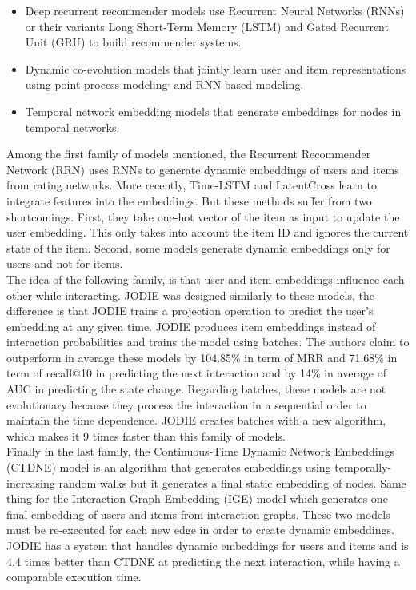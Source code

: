 {\begin{itemize}
    \item Deep recurrent recommender models use Recurrent Neural Networks\supercite{Rumelhart1986} (RNNs) or their variants Long Short-Term Memory\supercite{LSTM} (LSTM) and Gated Recurrent Unit\supercite{https://doi.org/10.48550/arxiv.1406.1078GRU} (GRU) to build recommender systems.
    \item Dynamic co-evolution models that jointly learn user and item representations using point-process modeling\supercite{https://doi.org/10.48550/arxiv.1705.05742}$^,$\supercite{NIPS2016_53ed35c7} and RNN-based modeling\supercite{https://doi.org/10.48550/arxiv.1609.03675}.
    \item Temporal network embedding models that generate embeddings for nodes in temporal networks.
\end{itemize}
Among the first family of models mentioned, the Recurrent Recommender Network\supercite{10.1145/3018661.3018689} (RRN) uses RNNs to generate dynamic embeddings of users and items from rating networks. More recently, Time-LSTM\supercite{ijcai2017-504} and LatentCross\supercite{46488} learn to integrate features into the embeddings. But these methods suffer from two shortcomings. First, they take one-hot vector of the item as input to update the user embedding. This only takes into account the item ID and ignores the current state of the item. Second, some models generate dynamic embeddings only for users and not for items.\\

The idea of the following family, is that user and item embeddings influence each other while interacting. JODIE was designed similarly to these models, the difference is that JODIE trains a projection operation to predict the user's embedding at any given time. JODIE produces item embeddings instead of interaction probabilities and trains the model using batches. The authors claim to outperform in average these models by 104.85\% in term of MRR and 71.68\% in term of recall@10 in predicting the next interaction and by 14\% in average of AUC in predicting the state change. Regarding batches, these models are not evolutionary because they process the interaction in a sequential order to maintain the time dependence. JODIE creates batches with a new algorithm, which makes it 9 times faster than this family of models.\\

Finally in the last family, the Continuous-Time Dynamic Network Embeddings\supercite{CTDNE} (CTDNE) model is an algorithm that generates embeddings using temporally-increasing random walks but it generates a final static embedding of nodes. Same thing for the Interaction Graph Embedding\supercite{IGE} (IGE) model which generates one final embedding of users and items from interaction graphs. These two models must be re-executed for each new edge in order to create dynamic embeddings. JODIE has a system that handles dynamic embeddings for users and items and is 4.4 times better than CTDNE at predicting the next interaction, while having a comparable execution time. \\

}
